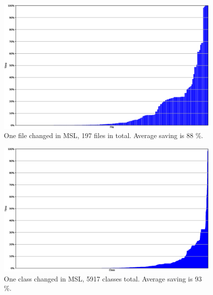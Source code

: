 \documentclass{cslthse-msc}
\begin{document}
\begin{figure}[!htbp]
    \centering
    \includegraphics[width=\textwidth]{Graphs/MSL_one_file.eps}
    \caption{One file changed in MSL, 197 files in total. Average saving is 88 \%.}
    \label{fig:mslonefile}
\end{figure}

\begin{figure}[!htbp]
    \centering
    \includegraphics[width=\textwidth]{Graphs/MSL_one_model.eps}
    \caption{One class changed in MSL, 5917 classes total. Average saving is 93 \%. }
    \label{fig:mslonemodel}
\end{figure}
\end{document}
